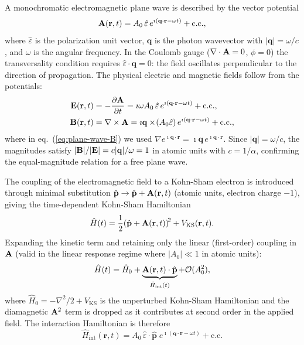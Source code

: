 A monochromatic electromagnetic plane wave is described by the
vector potential
\begin{equation}
  \Avec(\mathbf{r},t)
  = A_0\,\hat{\varepsilon}\,
    e^{\imath(\mathbf{q}\cdot\mathbf{r}-\omega t)}
    + \text{c.c.},
  \label{eq:plane-wave-A}
\end{equation}
where $\hat{\varepsilon}$ is the polarization unit vector,
$\mathbf{q}$ is the photon wavevector with $|\mathbf{q}|=\omega/c$,
and $\omega$ is the angular frequency.
In the Coulomb gauge ($\nabla\cdot\Avec=0$, $\phi=0$) the transversality
condition requires $\hat{\varepsilon}\cdot\mathbf{q}=0$: the field
oscillates perpendicular to the direction of propagation.
The physical electric and magnetic fields follow from the potentials:
\begin{align}
  \Evec(\mathbf{r},t)
  &= -\frac{\partial\Avec}{\partial t}
   = \imath\omega A_0\,\hat{\varepsilon}\,
     e^{\imath(\mathbf{q}\cdot\mathbf{r}-\omega t)}
     + \text{c.c.},
  \label{eq:plane-wave-E}
  \\
  \Bvec(\mathbf{r},t)
  &= \nabla\times\Avec
   = \imath\mathbf{q}\times
     \!\left(A_0\hat{\varepsilon}\right)
     e^{\imath(\mathbf{q}\cdot\mathbf{r}-\omega t)}
     + \text{c.c.},
  \label{eq:plane-wave-B}
\end{align}
where in eq.~(\ref{eq:plane-wave-B}) we used
$\nabla e^{\imath\mathbf{q}\cdot\mathbf{r}}
= \imath\mathbf{q}\,e^{\imath\mathbf{q}\cdot\mathbf{r}}$.
Since $|\mathbf{q}|=\omega/c$, the magnitudes satisfy
$|\Bvec|/|\Evec| = c|\mathbf{q}|/\omega = 1$ in atomic units with
$c=1/\alpha$, confirming the equal-magnitude relation for a free
plane wave.

The coupling of the electromagnetic field to a Kohn-Sham electron
is introduced through minimal substitution
$\hat{\mathbf{p}} \to \hat{\mathbf{p}} + \Avec(\mathbf{r},t)$
(atomic units, electron charge $-1$),
giving the time-dependent Kohn-Sham Hamiltonian
\begin{equation}
  \hat{H}(t)
  = \frac{1}{2}
    \!\left(\hat{\mathbf{p}} + \Avec(\mathbf{r},t)\right)^{\!2}
    + V_\mathrm{KS}(\mathbf{r},t).
  \label{eq:H-minimal}
\end{equation}
Expanding the kinetic term and retaining only the linear (first-order)
coupling in $\Avec$ (valid in the linear response regime where
$|A_0|\ll 1$ in atomic units):
\begin{equation}
  \hat{H}(t)
  = \hat{H}_0
  + \underbrace{\Avec(\mathbf{r},t)\cdot\hat{\mathbf{p}}}_{\hat{H}_\mathrm{int}(t)}
  + \mathcal{O}(A_0^2),
  \label{eq:H-linear}
\end{equation}
where $\hat{H}_0 = -\nabla^2/2 + V_\mathrm{KS}$ is the unperturbed
Kohn-Sham Hamiltonian and the diamagnetic $\Avec^2$ term is dropped
as it contributes at second order in the applied
field.\cite{yabana-bertsch-1996,Mattiat-Luber-2022}
The interaction Hamiltonian is therefore
\begin{equation}
  \hat{H}_\mathrm{int}(\mathbf{r},t)
  = A_0\,\hat{\varepsilon}\cdot\hat{\mathbf{p}}\;
    e^{\imath(\mathbf{q}\cdot\mathbf{r}-\omega t)}
    + \text{c.c.}
  \label{eq:Hint-full}
\end{equation}

